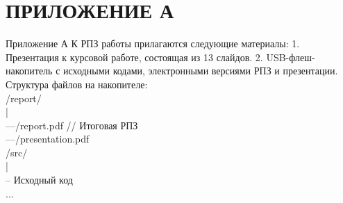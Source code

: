 \section*{ПРИЛОЖЕНИЕ А}

Приложение А
К РПЗ работы прилагаются следующие материалы:
1. Презентация к курсовой работе, состоящая из 13 слайдов.
2. USB-флеш-накопитель с исходными кодами, электронными версиями РПЗ и презентации.
Структура файлов на накопителе: \\
/report/ \\
| \\
---/report.pdf // Итоговая РПЗ \\
---/presentation.pdf \\
/src/  \\
| \\
-- Исходный код \\
...